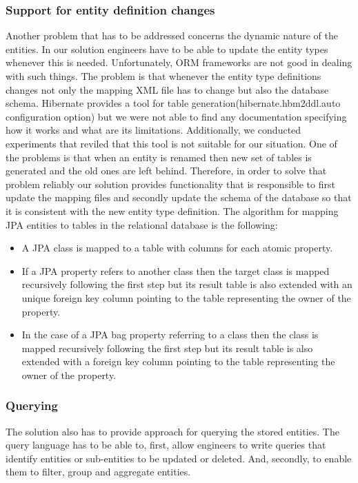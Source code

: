 \subsubsection{Support for entity definition changes}

Another problem that has to be addressed concerns the dynamic nature of the entities. In our solution engineers have to be able to update the entity types whenever this is needed. Unfortunately, ORM frameworks are not good in dealing with such things. The problem is that whenever the entity type definitions changes not only the mapping XML file has to change but also the database schema. Hibernate provides a tool for table generation(hibernate.hbm2ddl.auto configuration option) but we were not able to find any documentation specifying how it works and what are its limitations. Additionally, we conducted experiments that reviled that this tool is not suitable for our situation. One of the problems is that when an entity is renamed then new set of tables is generated and the old ones are left behind. Therefore, in order to solve that problem reliably our solution provides functionality that is responsible to first update the mapping files and secondly update the schema of the database so that it is consistent with the new entity type definition. The algorithm for mapping JPA entities to tables in the relational database is the following:

\begin{itemize}
	\item A JPA class is mapped to a table with columns for each atomic property. 
	\item If a JPA property refers to another class then the target class is mapped recursively following the first step but its result table is also extended with an unique foreign key column pointing to the table representing the owner of the property.
	\item In the case of a JPA bag property referring to a class then the class is mapped recursively following the first step but its result table is also extended with a foreign key column pointing to the table representing the owner of the property.
\end{itemize}
 

\subsubsection{Querying}

The solution also has to provide approach for querying the stored entities. The query language has to be able to, first, allow engineers to write queries that identify entities or sub-entities to be updated or deleted. And, secondly, to enable them to filter, group and aggregate entities. 

